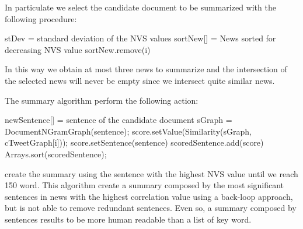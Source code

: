 In particulate we select the candidate document to be summarized with the following procedure:


\begin{algorithmic}
\STATE stDev = standard deviation of the NVS values
\STATE sortNew[] = News sorted for decreasing NVS value
		\STATE sortNew.remove(i)
	\ENDIF
\ENDFOR
\end{algorithmic}


In this way we obtain at most three news to summarize and the intersection of the selected news will never be empty since we intersect quite similar news.

The summary algorithm perform the following action:


\begin{algorithmic}
\STATE newSentence[] = sentence of the candidate document
	\STATE sGraph = DocumentNGramGraph(sentence);
    \STATE score.setValue(Similarity(sGraph, cTweetGraph[i]));
    \STATE score.setSentence(sentence)
    \STATE scoredSentence.add(score)
\ENDFOR
\STATE Arrays.sort(scoredSentence);
\end{algorithmic}

create the summary using the sentence with the highest NVS value until we reach 150 word.
This algorithm create a summary composed by the most significant sentences in news with the highest correlation value using a back-loop approach, but is not able to remove redundant sentences. Even so, a summary composed by sentences results to be more human readable than a list of key word.



